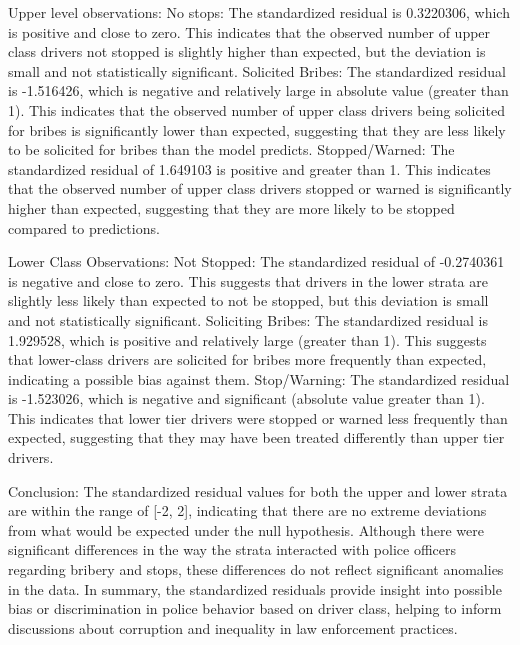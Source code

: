 \documentclass[12pt,letterpaper]{article}
\begin{document}
\begin{enumerate}
	Upper level observations:
	No stops: The standardized residual is 0.3220306, which is positive and close to zero. This indicates that the observed number of upper class drivers not stopped is slightly higher than expected, but the deviation is small and not statistically significant.
	Solicited Bribes: The standardized residual is -1.516426, which is negative and relatively large in absolute value (greater than 1). This indicates that the observed number of upper class drivers being solicited for bribes is significantly lower than expected, suggesting that they are less likely to be solicited for bribes than the model predicts.
	Stopped/Warned: The standardized residual of 1.649103 is positive and greater than 1. This indicates that the observed number of upper class drivers stopped or warned is significantly higher than expected, suggesting that they are more likely to be stopped compared to predictions.
	
	Lower Class Observations:
	Not Stopped: The standardized residual of -0.2740361 is negative and close to zero. This suggests that drivers in the lower strata are slightly less likely than expected to not be stopped, but this deviation is small and not statistically significant.
	Soliciting Bribes: The standardized residual is 1.929528, which is positive and relatively large (greater than 1). This suggests that lower-class drivers are solicited for bribes more frequently than expected, indicating a possible bias against them.
	Stop/Warning: The standardized residual is -1.523026, which is negative and significant (absolute value greater than 1). This indicates that lower tier drivers were stopped or warned less frequently than expected, suggesting that they may have been treated differently than upper tier drivers.
	
	Conclusion:
	The standardized residual values for both the upper and lower strata are within the range of [-2, 2], indicating that there are no extreme deviations from what would be expected under the null hypothesis. Although there were significant differences in the way the strata interacted with police officers regarding bribery and stops, these differences do not reflect significant anomalies in the data.
	In summary, the standardized residuals provide insight into possible bias or discrimination in police behavior based on driver class, helping to inform discussions about corruption and inequality in law enforcement practices.
	

	
\end{enumerate}
\newpage
\end{document}

